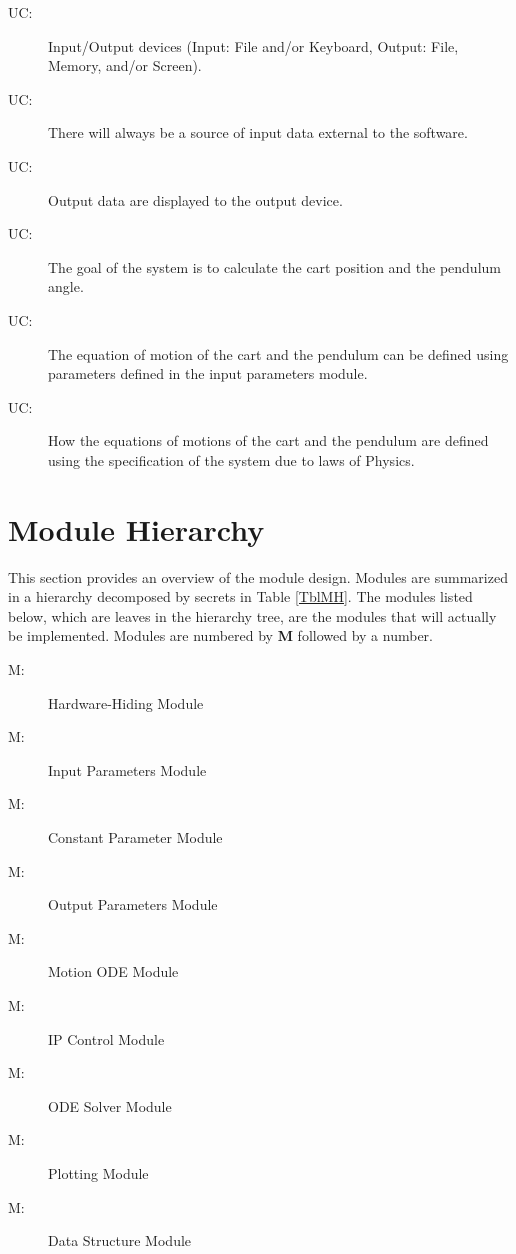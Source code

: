\documentclass[12pt, titlepage]{article}
\newcounter{ucnum}
\newcommand{\uctheucnum}{UC\theucnum}
\newcounter{mnum}
\newcommand{\mthemnum}{M\themnum}
\begin{document}
\begin{description}
\item[ \uctheucnum \label{ucIO}:] Input/Output devices (Input: File and/or Keyboard, Output: File, Memory, and/or Screen).
\item[ \uctheucnum \label{ucInput}:] There will always be a source of input data external to the software.
\item[ \uctheucnum \label{ucOutput}:] Output data are displayed to the output device.
\item[ \uctheucnum \label{ucGoal}:] The goal of the system is to calculate the cart position and the pendulum angle.
\item[ \uctheucnum \label{ucODEstructureC}:] The equation of motion of the cart and the pendulum can be defined using parameters defined in the input parameters module.
\item[ \uctheucnum \label{ucEqM}:] How the equations of motions of the cart and the pendulum are defined using the specification of the system due to laws of Physics.
 
\end{description}

\section{Module Hierarchy} \label{SecMH}

This section provides an overview of the module design. Modules are summarized in a hierarchy decomposed by secrets in Table \ref{TblMH}. The modules listed below, which are leaves in the hierarchy tree, are the modules that will actually be implemented. Modules are numbered by \textbf{M} followed by a number. 

\begin{description}
\item [ \mthemnum \label{mHH}:] Hardware-Hiding Module
\item [ \mthemnum \label{mParams}:] Input Parameters Module
\item [ \mthemnum \label{mCons}:] 
Constant Parameter Module
\item [ \mthemnum \label{mOutput}:] Output Parameters Module
\item [ \mthemnum \label{mODEC}:] Motion ODE  Module

\item [ \mthemnum \label{mControl}:] IP Control Module
\item [ \mthemnum \label{mSolver}:] ODE Solver Module
\item [ \mthemnum \label{mPlot}:] Plotting Module
\item [ \mthemnum \label{mDS}:]
Data Structure Module
\end{description}
\end{document}
